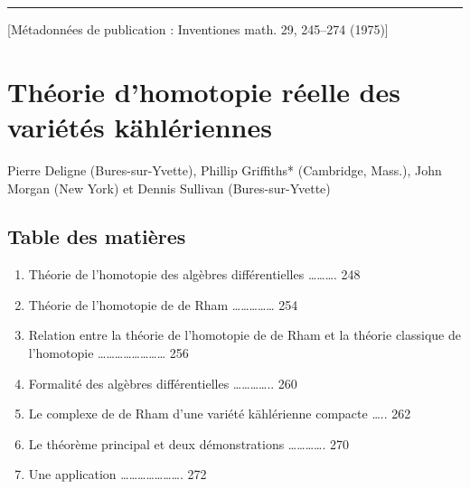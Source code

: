 \documentclass[
  french,
  a3paper,
  a3paper]{extarticle}
\author{}
\date{}
\providecommand{\tightlist}{%
  \setlength{\itemsep}{0pt}\setlength{\parskip}{0pt}}
\begin{document}



\par

\vspace{0.7mm}\hrule\vspace{1.6mm}

\fontsize{9}{11}\selectfont

{[}Métadonnées de publication : Inventiones math. 29, 245--274 (1975){]}

\section{Théorie d'homotopie réelle des variétés
kählériennes}\label{thuxe9orie-dhomotopie-ruxe9elle-des-variuxe9tuxe9s-kuxe4hluxe9riennes}

Pierre Deligne (Bures-sur-Yvette), Phillip Griffiths* (Cambridge,
Mass.), John Morgan (New York) et Dennis Sullivan (Bures-sur-Yvette)

\subsection{Table des matières}\label{table-des-matiuxe8res}

\begin{enumerate}
\def\labelenumi{\arabic{enumi}.}
\tightlist
\item
  Théorie de l'homotopie des algèbres différentielles
  \ldots\ldots\ldots. 248
\item
  Théorie de l'homotopie de de Rham \ldots\ldots\ldots\ldots\ldots{} 254
\item
  Relation entre la théorie de l'homotopie de de Rham et la théorie
  classique de l'homotopie
  \ldots\ldots\ldots\ldots\ldots\ldots\ldots\ldots{} 256
\item
  Formalité des algèbres différentielles \ldots\ldots\ldots\ldots.. 260
\item
  Le complexe de de Rham d'une variété kählérienne compacte \ldots.. 262
\item
  Le théorème principal et deux démonstrations \ldots\ldots\ldots\ldots.
  270
\item
  Une application \ldots\ldots\ldots\ldots\ldots\ldots\ldots. 272
\end{enumerate}
\end{document}
